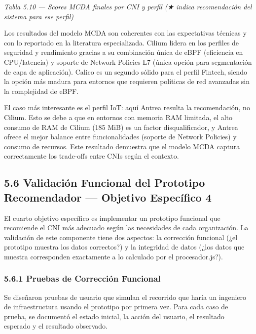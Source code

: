 \documentclass[journal]{IEEEtran}
\begin{document}
\begin{center}\emph{\emph{Tabla 5.10 --- Scores MCDA finales por CNI y perfil (★ indica recomendación del sistema para ese perfil)}}\end{center}

Los resultados del modelo MCDA son coherentes con las expectativas técnicas y con lo reportado en la literatura especializada. Cilium lidera en los perfiles de seguridad y rendimiento gracias a su combinación única de eBPF (eficiencia en CPU/latencia) y soporte de Network Policies L7 (única opción para segmentación de capa de aplicación). Calico es un segundo sólido para el perfil Fintech, siendo la opción más madura para entornos que requieren políticas de red avanzadas sin la complejidad de eBPF.

El caso más interesante es el perfil IoT: aquí Antrea resulta la recomendación, no Cilium. Esto se debe a que en entornos con memoria RAM limitada, el alto consumo de RAM de Cilium (185 MiB) es un factor disqualificador, y Antrea ofrece el mejor balance entre funcionalidades (soporte de Network Policies) y consumo de recursos. Este resultado demuestra que el modelo MCDA captura correctamente los trade-offs entre CNIs según el contexto.

\subsection{5.6 Validación Funcional del Prototipo Recomendador --- Objetivo Específico 4}

El cuarto objetivo específico es implementar un prototipo funcional que recomiende el CNI más adecuado según las necesidades de cada organización. La validación de este componente tiene dos aspectos: la corrección funcional (¿el prototipo muestra los datos correctos?) y la integridad de datos (¿los datos que muestra corresponden exactamente a lo calculado por el procesador.js?).

\subsubsection{5.6.1 Pruebas de Corrección Funcional}

Se diseñaron pruebas de usuario que simulan el recorrido que haría un ingeniero de infraestructura usando el prototipo por primera vez. Para cada caso de prueba, se documentó el estado inicial, la acción del usuario, el resultado esperado y el resultado observado.
\end{document}

